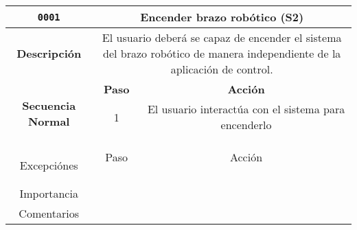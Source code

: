 \begin{table}[H]
\centering
\begin{tabular}{|c|c|c|}
\hline
\texttt{0001}                   & \multicolumn{2}{c|}{Encender brazo robótico (S2)} \\ \hline
\textbf{Descripción}            & \multicolumn{2}{m{13cm}|}{El usuario deberá se capaz de encender el sistema del brazo robótico de manera independiente de la aplicación de control.}  
\\ \hline
\multirow{5}{*}{\textbf{Secuencia Normal}} & \textbf{Paso} & \textbf{Acción}
\\ \cline{2-3}                    &   1  & El usuario interactúa con el sistema para encenderlo
\\ \cline{2-3}    
                                  &                                      &                                       \\ \cline{2-3} 
                                  &                                      &                                       \\ \cline{2-3} 
                                  &                                      &                                       \\ \hline
\multirow{5}{*}{Excepciónes}      & Paso                                 & Acción                                \\ \cline{2-3} 
                                  &                                      &                                       \\ \cline{2-3} 
                                  &                                      &                                       \\ \cline{2-3} 
                                  &                                      &                                       \\ \cline{2-3} 
                                  &                                      &                                       \\ \hline
Importancia                       & \multicolumn{2}{l|}{}                                                        \\ \hline
Comentarios                       & \multicolumn{2}{l|}{}                                                        \\ \hline
\end{tabular}
\end{table}